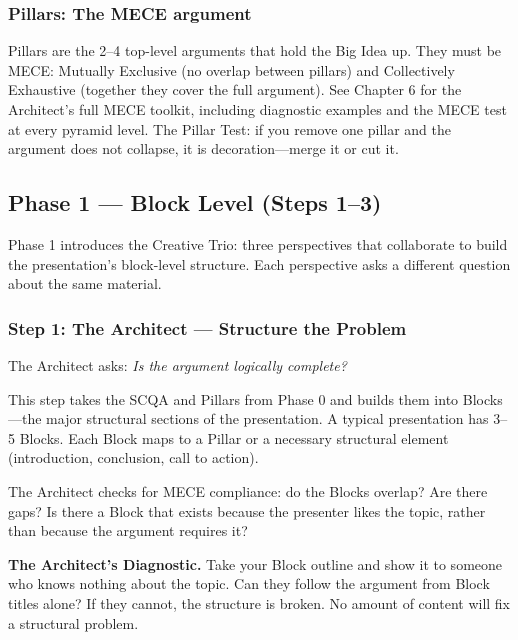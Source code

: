 \subsubsection{Pillars: The MECE argument}

Pillars are the 2--4 top-level arguments that hold the Big Idea up. They must be MECE: Mutually Exclusive (no overlap between pillars) and Collectively Exhaustive (together they cover the full argument). See Chapter 6 for the Architect's full MECE toolkit, including diagnostic examples and the MECE test at every pyramid level. The Pillar Test: if you remove one pillar and the argument does not collapse, it is decoration---merge it or cut it.

\subsection{Phase 1 --- Block Level (Steps 1--3)}

Phase 1 introduces the Creative Trio: three perspectives that collaborate to build the presentation's block-level structure. Each perspective asks a different question about the same material.

\subsubsection{Step 1: The Architect --- Structure the Problem}

The Architect asks: \emph{Is the argument logically complete?}

This step takes the SCQA and Pillars from Phase 0 and builds them into Blocks---the major structural sections of the presentation. A typical presentation has 3--5 Blocks. Each Block maps to a Pillar or a necessary structural element (introduction, conclusion, call to action).

The Architect checks for MECE compliance: do the Blocks overlap? Are there gaps? Is there a Block that exists because the presenter likes the topic, rather than because the argument requires it?

\begin{diagnosisbox}
\textbf{The Architect's Diagnostic.} Take your Block outline and show it to someone who knows nothing about the topic. Can they follow the argument from Block titles alone? If they cannot, the structure is broken. No amount of content will fix a structural problem.
\end{diagnosisbox}

